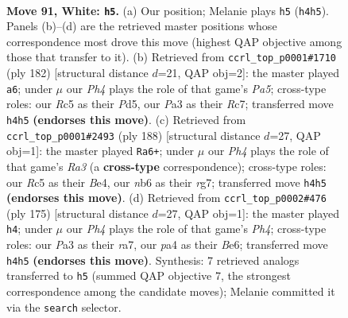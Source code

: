 \documentclass[11pt]{article}
\begin{document}
\clearpage

\begin{figure}[p]\centering
\begin{subfigure}{0.46\textwidth}\centering
\resizebox{\linewidth}{!}{%
\newchessgame
\chessboard[
  setfen={6k1/3r4/1n3P1B/2R5/p6P/P7/7K/8 w - - 1 91},
  showmover=false,
  pgfstyle=straightmove, color=movearrow, markmove={h4-h5}
]}
\caption{}
\end{subfigure}\hfill
\begin{subfigure}{0.46\textwidth}\centering
\resizebox{\linewidth}{!}{%
\newchessgame
\chessboard[
  setfen={8/2R5/3p4/P2P1n2/5k2/6r1/KP6/8 w - - 2 92},
  showmover=false,
  pgfstyle=straightmove, color=movearrow, markmove={a5-a6}
]}
\caption{}
\end{subfigure}
\\[4pt]
\begin{subfigure}{0.46\textwidth}\centering
\resizebox{\linewidth}{!}{%
\newchessgame
\chessboard[
  setfen={4b3/6r1/4k2p/8/4B2P/R7/4K3/8 w - - 0 95},
  showmover=false,
  pgfstyle=straightmove, color=movearrow, markmove={a3-a6}
]}
\caption{}
\end{subfigure}\hfill
\begin{subfigure}{0.46\textwidth}\centering
\resizebox{\linewidth}{!}{%
\newchessgame
\chessboard[
  setfen={5k2/R7/4bp2/6pp/8/6P1/5K2/8 b - - 11 88},
  showmover=false,
  pgfstyle=straightmove, color=movearrow, markmove={h5-h4}
]}
\caption{}
\end{subfigure}
\caption{\textbf{Move 91, White: \texttt{h5}.} (a) Our position; Melanie plays \texttt{h5} (\texttt{h4h5}). Panels (b)--(d) are the retrieved master positions whose correspondence most drove this move (highest QAP objective among those that transfer to it). (b) Retrieved from \texttt{ccrl\_top\_p0001\#1710} (ply 182) [structural distance $d$=21, QAP obj=2]: the master played \texttt{a6}; under $\mu$ our \emph{Ph4} plays the role of that game's \emph{Pa5}; cross-type roles: our \emph{R}c5 as their \emph{P}d5, our \emph{P}a3 as their \emph{R}c7; transferred move \texttt{h4h5} \textbf{(endorses this move)}. (c) Retrieved from \texttt{ccrl\_top\_p0001\#2493} (ply 188) [structural distance $d$=27, QAP obj=1]: the master played \texttt{Ra6+}; under $\mu$ our \emph{Ph4} plays the role of that game's \emph{Ra3} (a \textbf{cross-type} correspondence); cross-type roles: our \emph{R}c5 as their \emph{B}e4, our \emph{n}b6 as their \emph{r}g7; transferred move \texttt{h4h5} \textbf{(endorses this move)}. (d) Retrieved from \texttt{ccrl\_top\_p0002\#476} (ply 175) [structural distance $d$=27, QAP obj=1]: the master played \texttt{h4}; under $\mu$ our \emph{Ph4} plays the role of that game's \emph{Ph4}; cross-type roles: our \emph{P}a3 as their \emph{r}a7, our \emph{p}a4 as their \emph{B}e6; transferred move \texttt{h4h5} \textbf{(endorses this move)}. Synthesis: 7 retrieved analogs transferred to \texttt{h5} (summed QAP objective 7, the strongest correspondence among the candidate moves); Melanie committed it via the \texttt{search} selector.}
\label{fig:thought-m180}
\end{figure}
\end{document}
